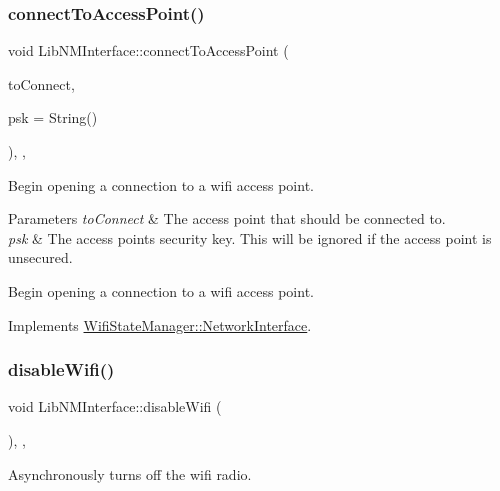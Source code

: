 \subsubsection{\texorpdfstring{connect\+To\+Access\+Point()}{connectToAccessPoint()}}
{\footnotesize\ttfamily void Lib\+N\+M\+Interface\+::connect\+To\+Access\+Point (\begin{DoxyParamCaption}\item[{\mbox{\hyperlink{classWifiAccessPoint_ad18977f884076774803027efbaa131a0}{Wifi\+Access\+Point\+::\+Ptr}}}]{to\+Connect,  }\item[{String}]{psk = {\ttfamily String()} }\end{DoxyParamCaption})\hspace{0.3cm}{\ttfamily [override]}, {\ttfamily [protected]}, {\ttfamily [virtual]}}

Begin opening a connection to a wifi access point.


\begin{DoxyParams}{Parameters}
{\em to\+Connect} & The access point that should be connected to.\\
\hline
{\em psk} & The access point\textquotesingle{}s security key. This will be ignored if the access point is unsecured.\\
\hline
\end{DoxyParams}
Begin opening a connection to a wifi access point. 

Implements \mbox{\hyperlink{classWifiStateManager_1_1NetworkInterface_a5c8a6cb7df8aaf53a0ebdf56aefc5080}{Wifi\+State\+Manager\+::\+Network\+Interface}}.

\mbox{\label{classLibNMInterface_a49b4c61f6f8794d6af742464ab0f2d93}} 
\subsubsection{\texorpdfstring{disable\+Wifi()}{disableWifi()}}
{\footnotesize\ttfamily void Lib\+N\+M\+Interface\+::disable\+Wifi (\begin{DoxyParamCaption}{ }\end{DoxyParamCaption})\hspace{0.3cm}{\ttfamily [override]}, {\ttfamily [protected]}, {\ttfamily [virtual]}}

Asynchronously turns off the wifi radio. 

